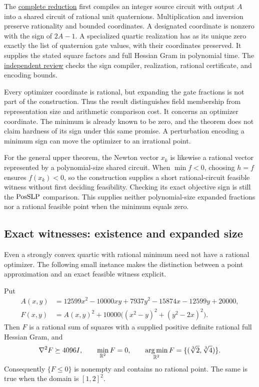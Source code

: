 The
\href{../../research-20260927/rational-optimizer-posslp-coordinate-comparison.md}{complete reduction}
first compiles an integer source circuit with output $A$ into a shared
circuit of rational unit quaternions. Multiplication and inversion
preserve rationality and bounded coordinates. A designated coordinate
is nonzero with the sign of $2A-1$. A specialized quartic realization
has as its unique zero exactly the list of quaternion gate values,
with their coordinates preserved. It supplies the stated square
factors and full Hessian Gram in polynomial time. The
\href{../reviews/exact-core/rational-review.md}{independent review}
checks the sign compiler, realization, rational certificate, and
encoding bounds.

Every optimizer coordinate is rational, but expanding the gate
fractions is not part of the construction. Thus the result distinguishes
field membership from representation size and arithmetic comparison
cost. It concerns an optimizer coordinate. The minimum is already
known to be zero, and the theorem does not claim hardness of its sign
under this same promise. A perturbation encoding a minimum sign can
move the optimizer to an irrational point.

For the general upper theorem, the Newton vector $x_k$ is likewise a
rational vector represented by a polynomial-size shared circuit. When
$\min f<0$, choosing $h=f$ ensures $f(x_k)<0$, so the construction
supplies a short rational-circuit feasible witness without first
deciding feasibility. Checking its exact objective sign is still the
$\mathrm{PosSLP}$ comparison. This supplies neither polynomial-size expanded
fractions nor a rational feasible point when the minimum equals zero.

\subsection{Exact witnesses: existence and expanded size}

Even a strongly convex quartic with rational minimum need not have a
rational optimizer. The following small instance makes the distinction
between a point approximation and an exact feasible witness explicit.

\begin{proposition}
\label{prop:irrational-quartic-zero}
Put
\begin{align*}
 A(x,y)&=12599x^2-10000xy+7937y^2-15874x-12599y+20000,\\
 F(x,y)&=A(x,y)^2+10000\bigl((x^2-y)^2+(y^2-2x)^2\bigr).
\end{align*}
Then $F$ is a rational sum of squares with a supplied positive
definite rational full Hessian Gram, and
\[
 \nabla^2F\succeq4096I,\qquad
 \min_{\mathbb R^2}F=0,\qquad
 \operatorname*{arg\,min}_{\mathbb R^2}F=\{(\sqrt[3]{2},\sqrt[3]{4})\}.
\]
Consequently $\{F\le0\}$ is nonempty and contains no rational
point. The same is true when the domain is $[1,2]^2$.
\end{proposition}

